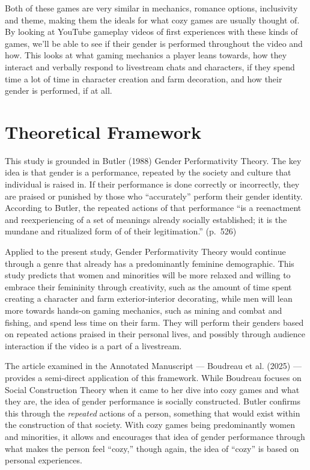 \documentclass[
  12pt,
  letterpaper,
  DIV=11,
  numbers=noendperiod]{scrreprt}
\begin{document}
Both of these games are very similar in mechanics, romance options,
inclusivity and theme, making them the ideals for what cozy games are
usually thought of. By looking at YouTube gameplay videos of first
experiences with these kinds of games, we'll be able to see if their
gender is performed throughout the video and how. This looks at what
gaming mechanics a player leans towards, how they interact and verbally
respond to livestream chats and characters, if they spend time a lot of
time in character creation and farm decoration, and how their gender is
performed, if at all.

\section{Theoretical Framework}\label{theoretical-framework}

This study is grounded in Butler (1988) Gender Performativity Theory.
The key idea is that gender is a performance, repeated by the society
and culture that individual is raised in. If their performance is done
correctly or incorrectly, they are praised or punished by those who
``accurately'' perform their gender identity. According to Butler, the
repeated actions of that performance ``is a reenactment and
reexperiencing of a set of meanings already socially established; it is
the mundane and ritualized form of of their legitimation.'' (p.~526)

Applied to the present study, Gender Performativity Theory would
continue through a genre that already has a predominantly feminine
demographic. This study predicts that women and minorities will be more
relaxed and willing to embrace their femininity through creativity, such
as the amount of time spent creating a character and farm
exterior-interior decorating, while men will lean more towards hands-on
gaming mechanics, such as mining and combat and fishing, and spend less
time on their farm. They will perform their genders based on repeated
actions praised in their personal lives, and possibly through audience
interaction if the video is a part of a livestream.

The article examined in the Annotated Manuscript --- Boudreau et al.
(2025) --- provides a semi-direct application of this framework. While
Boudreau focuses on Social Construction Theory when it came to her dive
into cozy games and what they are, the idea of gender performance is
socially constructed. Butler confirms this through the \emph{repeated}
actions of a person, something that would exist within the construction
of that society. With cozy games being predominantly women and
minorities, it allows and encourages that idea of gender performance
through what makes the person feel ``cozy,'' though again, the idea of
``cozy'' is based on personal experiences.
\end{document}
